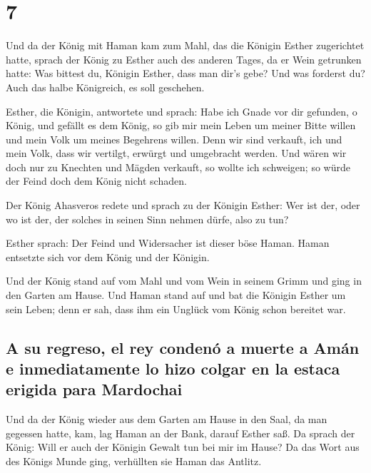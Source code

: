 \hypertarget{section-6}{%
\section{7}\label{section-6}}

 Und da der König mit Haman kam zum Mahl, das die Königin
Esther zugerichtet hatte,  sprach der König zu Esther auch
des anderen Tages, da er Wein getrunken hatte: Was bittest du, Königin
Esther, dass man dir's gebe? Und was forderst du? Auch das halbe
Königreich, es soll geschehen.

 Esther, die Königin, antwortete und sprach: Habe ich
Gnade vor dir gefunden, o König, und gefällt es dem König, so gib mir
mein Leben um meiner Bitte willen und mein Volk um meines Begehrens
willen.  Denn wir sind verkauft, ich und mein Volk, dass
wir vertilgt, erwürgt und umgebracht werden. Und wären wir doch nur zu
Knechten und Mägden verkauft, so wollte ich schweigen; so würde der
Feind doch dem König nicht schaden.

 Der König Ahasveros redete und sprach zu der Königin
Esther: Wer ist der, oder wo ist der, der solches in seinen Sinn nehmen
dürfe, also zu tun?

 Esther sprach: Der Feind und Widersacher ist dieser böse
Haman. Haman entsetzte sich vor dem König und der Königin.

 Und der König stand auf vom Mahl und vom Wein in seinem
Grimm und ging in den Garten am Hause. Und Haman stand auf und bat die
Königin Esther um sein Leben; denn er sah, dass ihm ein Unglück vom
König schon bereitet war.

\hypertarget{a-su-regreso-el-rey-condenuxf3-a-muerte-a-amuxe1n-e-inmediatamente-lo-hizo-colgar-en-la-estaca-erigida-para-mardochai}{%
\subsection{A su regreso, el rey condenó a muerte a Amán e
inmediatamente lo hizo colgar en la estaca erigida para
Mardochai}\label{a-su-regreso-el-rey-condenuxf3-a-muerte-a-amuxe1n-e-inmediatamente-lo-hizo-colgar-en-la-estaca-erigida-para-mardochai}}

 Und da der König wieder aus dem Garten am Hause in den
Saal, da man gegessen hatte, kam, lag Haman an der Bank, darauf Esther
saß. Da sprach der König: Will er auch der Königin Gewalt tun bei mir im
Hause? Da das Wort aus des Königs Munde ging, verhüllten sie Haman das
Antlitz.

